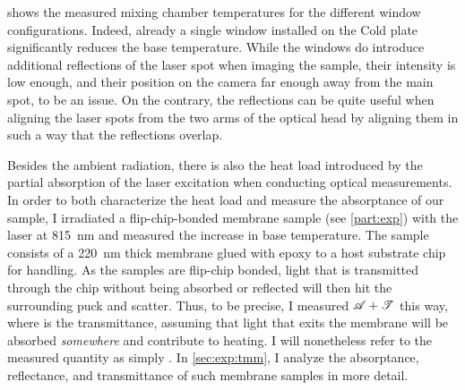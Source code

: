 shows the measured mixing chamber temperatures for the different window configurations.
Indeed, already a single window installed on the Cold plate significantly reduces the base temperature.
While the windows do introduce additional reflections of the laser spot when imaging the sample, their intensity is low enough, and their position on the camera far enough away from the main spot, to be an issue.
On the contrary, the reflections can be quite useful when aligning the laser spots from the two arms of the optical head by aligning them in such a way that the reflections overlap.

Besides the ambient radiation, there is also the heat load introduced by the partial absorption of the laser excitation when conducting optical measurements.
In order to both characterize the heat load and measure the absorptance \absorptance of our sample, I irradiated a flip-chip-bonded membrane sample (see \cref{part:exp}) with the laser at \qty{815}{\nano\meter} and measured the increase in base temperature.
The sample consists of a \qty{220}{\nano\meter} thick \GaAsAlGaAs membrane glued with epoxy to a  host substrate chip for handling.
As the samples are flip-chip bonded, light that is transmitted through the chip without being absorbed or reflected will then hit the surrounding puck and scatter.
Thus, to be precise, I measured $\mathscr{A}+\mathscr{T}$ this way, where \transmittance is the transmittance, assuming that light that exits the membrane will be absorbed \emph{somewhere} and contribute to heating.
I will nonetheless refer to the measured quantity as simply \absorptance.
In \cref{sec:exp:tmm}, I analyze the absorptance, reflectance, and transmittance of such membrane samples in more detail.

